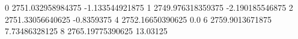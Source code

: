 0 2751.032958984375 -1.133544921875
1 2749.976318359375 -2.190185546875
2 2751.33056640625 -0.8359375
4 2752.16650390625 0.0
6 2759.9013671875 7.73486328125
8 2765.19775390625 13.03125
